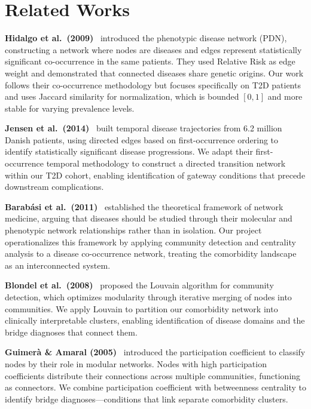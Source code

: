 \documentclass[10pt,twocolumn]{article}
\begin{document}
\section{Related Works}

\textbf{Hidalgo et al.\ (2009)}~\cite{hidalgo2009} introduced the phenotypic disease network (PDN), constructing a network where nodes are diseases and edges represent statistically significant co-occurrence in the same patients.
They used Relative Risk as edge weight and demonstrated that connected diseases share genetic origins.
Our work follows their co-occurrence methodology but focuses specifically on T2D patients and uses Jaccard similarity for normalization, which is bounded $[0,1]$ and more stable for varying prevalence levels.

\textbf{Jensen et al.\ (2014)}~\cite{jensen2014} built temporal disease trajectories from 6.2 million Danish patients, using directed edges based on first-occurrence ordering to identify statistically significant disease progressions.
We adapt their first-occurrence temporal methodology to construct a directed transition network within our T2D cohort, enabling identification of gateway conditions that precede downstream complications.

\textbf{Barab\'asi et al.\ (2011)}~\cite{barabasi2011} established the theoretical framework of network medicine, arguing that diseases should be studied through their molecular and phenotypic network relationships rather than in isolation.
Our project operationalizes this framework by applying community detection and centrality analysis to a disease co-occurrence network, treating the comorbidity landscape as an interconnected system.

\textbf{Blondel et al.\ (2008)}~\cite{blondel2008} proposed the Louvain algorithm for community detection, which optimizes modularity through iterative merging of nodes into communities.
We apply Louvain to partition our comorbidity network into clinically interpretable clusters, enabling identification of disease domains and the bridge diagnoses that connect them.

\textbf{Guimer\`a \& Amaral (2005)}~\cite{guimera2005} introduced the participation coefficient to classify nodes by their role in modular networks.
Nodes with high participation coefficients distribute their connections across multiple communities, functioning as connectors.
We combine participation coefficient with betweenness centrality to identify bridge diagnoses---conditions that link separate comorbidity clusters.
\end{document}
